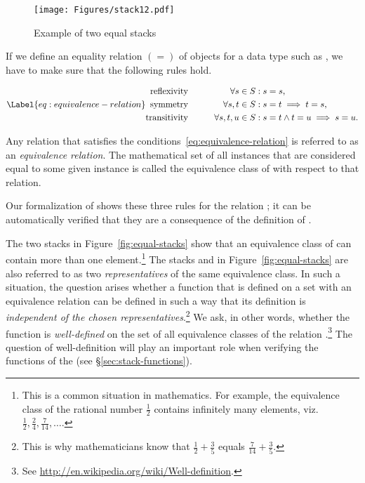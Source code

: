 \begin{figure}[hbt]
\centering
\texttt{[image: Figures/stack12.pdf]}
\caption{ Example of two equal stacks}
\end{figure}

\FloatBarrier

If we define an equality relation $(=)$ of objects for a data
type such as \stacktype,
we have to make sure that the following rules hold.

\begin{subequations}
\Label{eq:equivalence-relation}
\begin{align}
   \text{reflexivity}\qquad && \forall s \in S&: s = s,\\
   \text{symmetry}\qquad &&    \forall s,t \in S&: s = t \implies t = s,\\
   \text{transitivity}\qquad &&    \forall s,t,u \in S&: s = t \land t = u \implies s = u.
\end{align}
\end{subequations}


Any relation that satisfies the conditions~\eqref{eq:equivalence-relation}
is referred to as an \emph{equivalence relation}.
%
The mathematical set of all instances that are considered equal to
some given instance  is called the equivalence class of 
with respect to that relation.

Our formalization of  shows 
these three rules for the relation \StackEqual;
it can be automatically verified that they are a consequence of the
definition of \StackEqual.

The two stacks in Figure~\ref{fig:equal-stacks} show that
an equivalence class of \StackEqual
can contain more than one element.\footnote{
    This is a common situation in mathematics. For example,
    the equivalence class of
    the rational number $\frac{1}{2}$ contains infinitely many elements,
    viz.\ $\frac{1}{2},
    \frac{2}{4}, \frac{7}{14}, \ldots$.
}
The stacks  and  in Figure~\ref{fig:equal-stacks}
are also referred to as two \emph{representatives} of the
same equivalence class.
In such a situation, the question arises whether a function
that is defined on
a set with an equivalence relation can be defined in such a
way that its definition
is \emph{independent of the chosen representatives}.\footnote{
    This is why mathematicians know that
    $\frac{1}{2} + \frac{3}{5}$
    equals $\frac{7}{14} + \frac{3}{5}$.
}
We ask, in other words, whether the function is \emph{well-defined}
on the set of all equivalence classes of the relation \StackEqual.\footnote{
  See \url{http://en.wikipedia.org/wiki/Well-definition}.
}
The question of well-definition
will play an important role when verifying the functions of
the \stacktype (see \S\ref{sec:stack-functions}).

